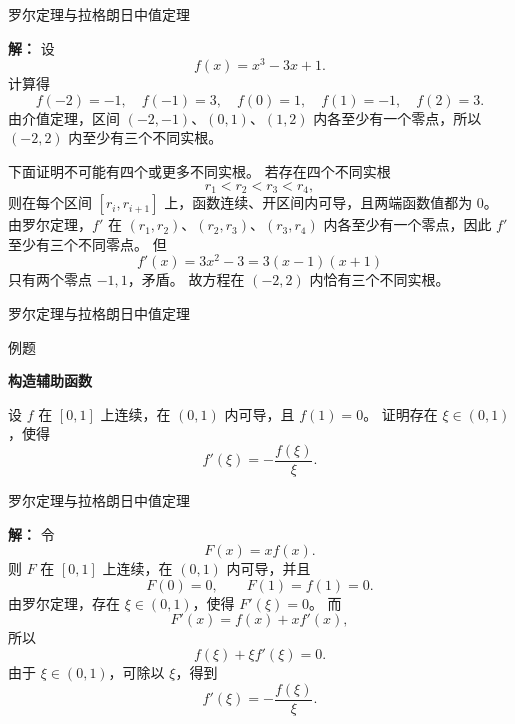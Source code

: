 \documentclass[aspectratio=169,10pt,fontset=fandol]{ctexbeamer}
\begin{document}
\begin{frame}[t,fragile]{罗尔定理与拉格朗日中值定理}
\footnotesize
{\footnotesize
\textbf{解：}
设
\[
f(x)=x^3-3x+1.
\]
计算得
\[
f(-2)=-1,\quad f(-1)=3,\quad f(0)=1,\quad f(1)=-1,\quad f(2)=3.
\]
由介值定理，区间 $(-2,-1)$、$(0,1)$、$(1,2)$ 内各至少有一个零点，所以 $(-2,2)$ 内至少有三个不同实根。

下面证明不可能有四个或更多不同实根。 若存在四个不同实根
\[
r_1<r_2<r_3<r_4,
\]
则在每个区间 $[r_i,r_{i+1}]$ 上，函数连续、开区间内可导，且两端函数值都为 $0$。 由罗尔定理，$f'$ 在 $(r_1,r_2)$、$(r_2,r_3)$、$(r_3,r_4)$ 内各至少有一个零点，因此 $f'$ 至少有三个不同零点。 但
\[
f'(x)=3x^2-3=3(x-1)(x+1)
\]
只有两个零点 $-1,1$，矛盾。 故方程在 $(-2,2)$ 内恰有三个不同实根。

}
\end{frame}
\begin{frame}[t,fragile]{罗尔定理与拉格朗日中值定理}
\footnotesize
\begin{block}{例题}
{\footnotesize
\textbf{构造辅助函数}\par

设 $f$ 在 $[0,1]$ 上连续，在 $(0,1)$ 内可导，且 $f(1)=0$。 证明存在 $\xi\in(0,1)$，使得
\[
f'(\xi)=-\frac{f(\xi)}{\xi}.
\]

}
\end{block}
\end{frame}
\begin{frame}[t,fragile]{罗尔定理与拉格朗日中值定理}
\footnotesize
{\footnotesize
\textbf{解：}
令
\[
F(x)=xf(x).
\]
则 $F$ 在 $[0,1]$ 上连续，在 $(0,1)$ 内可导，并且
\[
F(0)=0,\qquad F(1)=f(1)=0.
\]
由罗尔定理，存在 $\xi\in(0,1)$，使得 $F'(\xi)=0$。 而
\[
F'(x)=f(x)+xf'(x),
\]
所以
\[
f(\xi)+\xi f'(\xi)=0.
\]
由于 $\xi\in(0,1)$，可除以 $\xi$，得到
\[
f'(\xi)=-\frac{f(\xi)}{\xi}.
\]

}
\end{frame}
\end{document}
